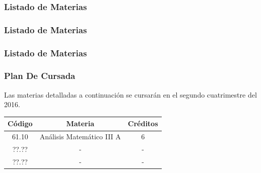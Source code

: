 \documentclass[a4paper,10pt]{article}
\begin{document}
    \newpage
    \subsubsection{Listado de Materias}
        

    \newpage
     

    \newpage
    \subsubsection{Listado de Materias}
        

    \newpage
     
    

    \newpage
    \subsubsection{Listado de Materias}
        

    \newpage
    \subsubsection{Plan De Cursada}
        Las materias detalladas a continuación se cursarán en el segundo cuatrimestre del 2016.
        \begin{center}
            \begin{tabular}{|c|c|c|}
                \hline
                \textbf{Código} & \textbf{Materia} & \textbf{Créditos} \\
                \hline
                61.10 & Análisis Matemático III A & 6 \\
                \hline
                ??.?? & - & - \\
                \hline
                ??.?? & - & - \\
                \hline
            \end{tabular}
        \end{center}
    \newpage
    {}
    
\end{document}
